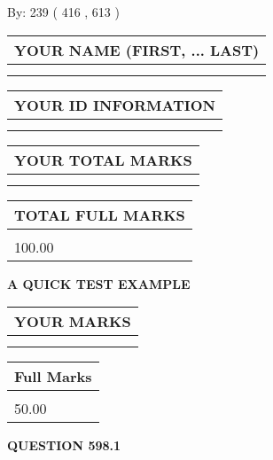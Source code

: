 \documentclass[12pt]{article}
\begin{document}
   
\hspace{1.0in} By: 
 239 ( 416 ,  613 )
   
   
   
   
\newpage 
\setcounter{page}{ 
   598001 } 
   
   
   
   
\noindent\begin{tabular}{|l|}
\hline
YOUR NAME (FIRST, ... LAST)  \\
\hline
 \\ 
 \\ 
\hline
\end{tabular}
\hspace{0.05in} \begin{tabular}{|l|}
\hline
 YOUR   ID   INFORMATION  \\
\hline
 \\ 
 \\ 
\hline
\end{tabular}
   
   
\vspace{0.2in}\noindent\begin{tabular}{|l|}
\hline
YOUR TOTAL MARKS  \\
\hline
 \\ 
 \\ 
\hline
\end{tabular}
\hspace{0.05in} \begin{tabular}{|l|}
\hline
TOTAL FULL MARKS  \\
\hline
 \\ 
100.00 \\
\hline
\end{tabular}
   
   
 \vspace{0.2in}
{\LARGE {\textbf{ A QUICK TEST EXAMPLE}}}
   
   
  
\vspace{0.2in}
  
\noindent\begin{tabular}{|l|}
\hline
 YOUR MARKS  \\
\hline
 \\ 
 \\ 
\hline
\end{tabular}
\hspace{0.05in} \begin{tabular}{|l|}
\hline
 Full Marks  \\
\hline
 \\ 
50.00 \\
\hline
\end{tabular}
{\textbf{\Large{QUESTION
598.1 
}}}
  
\end{document}
